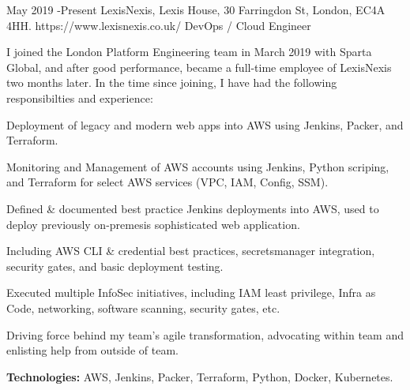 \documentclass[10pt]{article} %
\begin{document}
\job
{May 2019 -}{Present}
{LexisNexis, Lexis House, 30 Farringdon St, London, EC4A 4HH.}
{https://www.lexisnexis.co.uk/}
{DevOps / Cloud Engineer}
{
I joined the London Platform Engineering team in March 2019 with Sparta Global, and after good performance, became a full-time employee of LexisNexis two months later. In the time since joining, I have had the following responsibilties and experience:

\begin{itemize-noindent}[noitemsep]
\item{Deployment of legacy and modern web apps into AWS using Jenkins, Packer, and Terraform.}
\item{Monitoring and Management of AWS accounts using Jenkins, Python scriping, and Terraform for select AWS services (VPC, IAM, Config, SSM).}
\item{Defined \& documented best practice Jenkins deployments into AWS, used to deploy previously on-premesis sophisticated web application.}
\begin{itemize-noindent}[noitemsep]
\item{Including AWS CLI \& credential best practices, secretsmanager integration, security gates, and basic deployment testing.}
\end{itemize-noindent}
\item{Executed multiple InfoSec initiatives, including IAM least privilege, Infra as Code, networking, software scanning, security gates, etc.}
\item{Driving force behind my team's agile transformation, advocating within team and enlisting help from outside of team.}
\end{itemize-noindent}

\rule{0mm}{5mm}\textbf{Technologies:} AWS, Jenkins, Packer, Terraform, Python, Docker, Kubernetes.}

\end{document}
